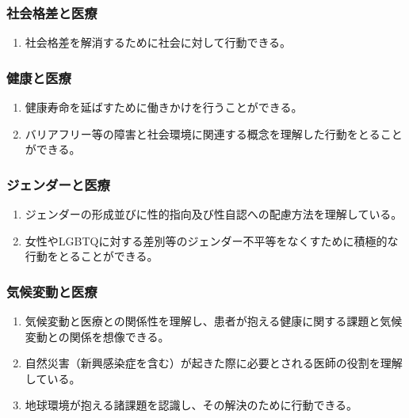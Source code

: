 \hypertarget{ux793eux4f1aux683cux5deeux3068ux533bux7642}{%
\subsubsection{社会格差と医療}\label{ux793eux4f1aux683cux5deeux3068ux533bux7642}}

\begin{enumerate}
\def\labelenumi{\arabic{enumi}.}
\tightlist
\item
  社会格差を解消するために社会に対して行動できる。
\end{enumerate}

\hypertarget{ux5065ux5eb7ux3068ux533bux7642}{%
\subsubsection{健康と医療}\label{ux5065ux5eb7ux3068ux533bux7642}}

\begin{enumerate}
\def\labelenumi{\arabic{enumi}.}
\tightlist
\item
  健康寿命を延ばすために働きかけを行うことができる。
\item
  バリアフリー等の障害と社会環境に関連する概念を理解した行動をとることができる。
\end{enumerate}

\hypertarget{ux30b8ux30a7ux30f3ux30c0ux30fcux3068ux533bux7642}{%
\subsubsection{ジェンダーと医療}\label{ux30b8ux30a7ux30f3ux30c0ux30fcux3068ux533bux7642}}

\begin{enumerate}
\def\labelenumi{\arabic{enumi}.}
\tightlist
\item
  ジェンダーの形成並びに性的指向及び性自認への配慮方法を理解している。
\item
  女性やLGBTQに対する差別等のジェンダー不平等をなくすために積極的な行動をとることができる。
\end{enumerate}

\hypertarget{ux6c17ux5019ux5909ux52d5ux3068ux533bux7642}{%
\subsubsection{気候変動と医療}\label{ux6c17ux5019ux5909ux52d5ux3068ux533bux7642}}

\begin{enumerate}
\def\labelenumi{\arabic{enumi}.}
\tightlist
\item
  気候変動と医療との関係性を理解し、患者が抱える健康に関する課題と気候変動との関係を想像できる。
\item
  自然災害（新興感染症を含む）が起きた際に必要とされる医師の役割を理解している。
\item
  地球環境が抱える諸課題を認識し、その解決のために行動できる。
\end{enumerate}

